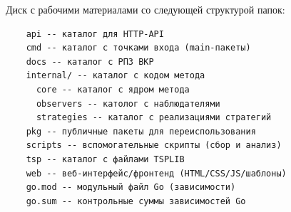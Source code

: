 
Диск с рабочими материалами со следующей структурой папок:
\begin{verbatim}
	api -- каталог для HTTP-API
	cmd -- каталог с точками входа (main-пакеты)
	docs -- каталог с РПЗ ВКР
	internal/ -- каталог с кодом метода
	  core -- каталог с ядром метода
	  observers -- католог с наблюдателями
	  strategies -- каталог с реализациями стратегий
	pkg -- публичные пакеты для переиспользования
	scripts -- вспомогательные скрипты (сбор и анализ)
	tsp -- каталог с файлами TSPLIB
	web -- веб-интерфейс/фронтенд (HTML/CSS/JS/шаблоны)
	go.mod -- модульный файл Go (зависимости)
	go.sum -- контрольные суммы зависимостей Go
\end{verbatim}